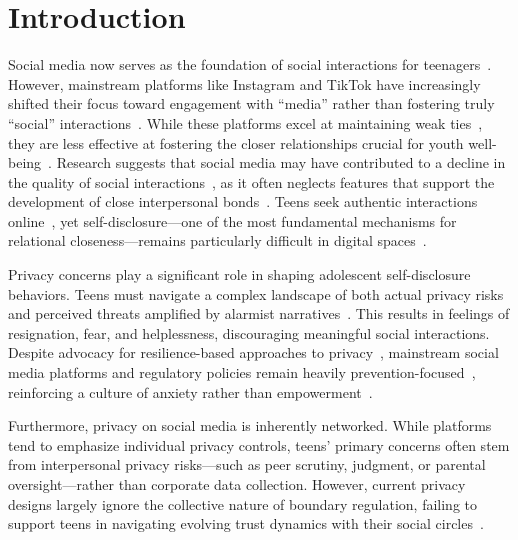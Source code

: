 \section{Introduction}
Social media now serves as the foundation of social interactions for teenagers~\cite{Anderson2023-qk}. However, mainstream platforms like Instagram and TikTok have increasingly shifted their focus toward engagement with ``media'' rather than fostering truly ``social'' interactions~\cite{Prinstein2023-pd}. While these platforms excel at maintaining weak ties~\cite{Ellison2011-ld}, they are less effective at fostering the closer relationships crucial for youth well-being~\cite{kim2025socialmediaisntjust}. Research suggests that social media may have contributed to a decline in the quality of social interactions~\cite{Putnam2000-ic, mcpherson2006social}, as it often neglects features that support the development of close interpersonal bonds~\cite{Lam2012-ct}. Teens seek authentic interactions online~\cite{10.1145/3686909, Reddy2024-ic}, yet self-disclosure---one of the most fundamental mechanisms for relational closeness---remains particularly difficult in digital spaces~\cite{Hogan2010-oh, Lenhart2015-cm}.

Privacy concerns play a significant role in shaping adolescent self-disclosure behaviors. Teens must navigate a complex landscape of both actual privacy risks and perceived threats amplified by alarmist narratives~\cite{Malkin-2022-RuntimePermissionsAssistants-p, kim2025privacysocialnormsystematically, de2020contextualizing}. This results in feelings of resignation, fear, and helplessness, discouraging meaningful social interactions. Despite advocacy for resilience-based approaches to privacy~\cite{Wisniewski2018-rc, Agha2023-mu}, mainstream social media platforms and regulatory policies remain heavily prevention-focused~\cite{meta-sue, Other-Other-NYState2023-S7694A-p, Kim-2024-AustraliaBarred-y}, reinforcing a culture of anxiety rather than empowerment~\cite{Weinstein2022-rh}. 

Furthermore, privacy on social media is inherently networked\cite{marwick2014networked, Petronio2002-ce}. While platforms tend to emphasize individual privacy controls, teens' primary concerns often stem from interpersonal privacy risks---such as peer scrutiny, judgment, or parental oversight---rather than corporate data collection\cite{zhao2022understanding}. However, current privacy designs largely ignore the collective nature of boundary regulation, failing to support teens in navigating evolving trust dynamics with their social circles~\cite{Lowens-2025-MisalignmentsDemographicFacebook-d}.

